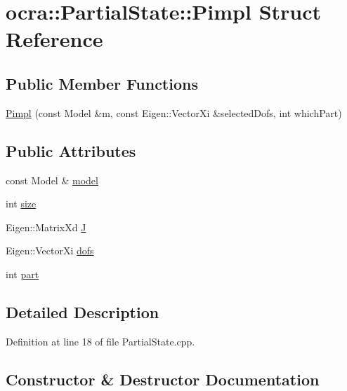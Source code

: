 \hypertarget{structocra_1_1PartialState_1_1Pimpl}{}\section{ocra\+:\+:Partial\+State\+:\+:Pimpl Struct Reference}
\label{structocra_1_1PartialState_1_1Pimpl}
\subsection*{Public Member Functions}
\begin{DoxyCompactItemize}
\item 
\hyperlink{structocra_1_1PartialState_1_1Pimpl_a4f12abe2e984af1d293d847dc3456724}{Pimpl} (const Model \&m, const Eigen\+::\+Vector\+Xi \&selected\+Dofs, int which\+Part)
\end{DoxyCompactItemize}
\subsection*{Public Attributes}
\begin{DoxyCompactItemize}
\item 
const Model \& \hyperlink{structocra_1_1PartialState_1_1Pimpl_a45e5572b9e9cbe6ac2d9ba4107a58bd6}{model}
\item 
int \hyperlink{structocra_1_1PartialState_1_1Pimpl_ac60f12a932c9bac309b2c1794de57a9c}{size}
\item 
Eigen\+::\+Matrix\+Xd \hyperlink{structocra_1_1PartialState_1_1Pimpl_a7c31cf81faa6abbbe780b9f143094418}{J}
\item 
Eigen\+::\+Vector\+Xi \hyperlink{structocra_1_1PartialState_1_1Pimpl_a206c2d1097d24706e5bf2d3a9b0862a8}{dofs}
\item 
int \hyperlink{structocra_1_1PartialState_1_1Pimpl_a605a55abed1d170fa6911088fefa7337}{part}
\end{DoxyCompactItemize}


\subsection{Detailed Description}


Definition at line 18 of file Partial\+State.\+cpp.



\subsection{Constructor \& Destructor Documentation}
\hypertarget{structocra_1_1PartialState_1_1Pimpl_a4f12abe2e984af1d293d847dc3456724}{}\label{structocra_1_1PartialState_1_1Pimpl_a4f12abe2e984af1d293d847dc3456724} 

